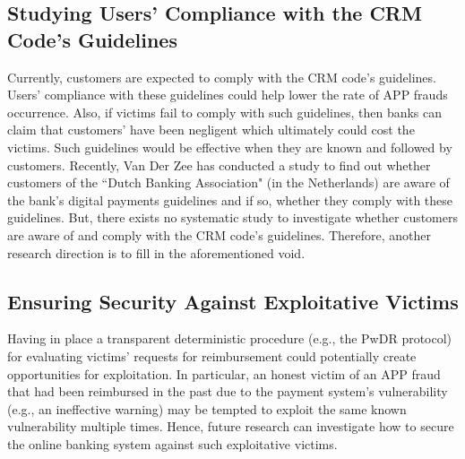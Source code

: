 \subsection{Studying Users' Compliance with the CRM Code's Guidelines}

Currently,   customers are expected to comply with the CRM code's guidelines.  Users'  compliance with these guidelines  could help lower the rate of APP frauds occurrence.  Also, if victims fail to comply with such  guidelines, then banks can claim that customers' have been negligent which ultimately could cost the victims. Such guidelines would be effective when they are known and followed by customers. Recently, Van Der Zee \cite{zee2021shifting}  has conducted a study to find out whether customers of the ``Dutch Banking Association" (in the Netherlands) are aware of the bank's digital payments guidelines and if so, whether they comply with these guidelines.  But, there exists no systematic study to  investigate whether  customers are aware of and comply with the CRM code's  guidelines. Therefore, another research direction is to fill in the aforementioned void. 



\subsection{Ensuring Security Against Exploitative Victims}



Having in place a transparent deterministic procedure (e.g.,  the PwDR protocol)  for evaluating victims' requests for reimbursement  could potentially create opportunities for exploitation. In particular, an honest victim  of an APP fraud that had been reimbursed in the past due to the payment system's vulnerability (e.g., an  ineffective warning) may be tempted to  exploit the same  known vulnerability multiple times. Hence, future research can investigate how to secure the online banking system against such exploitative victims.












